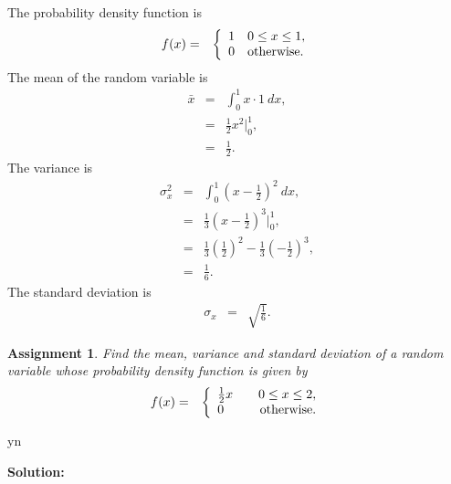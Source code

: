 \documentclass[12pt]{article}
\def\solutions{y}
\def\solutions{n}
\newtheorem{assignment}{Assignment}[section]
\newcommand{\lp}{\left(}
\newcommand{\rp}{\right)}
\begin{document}
The probability density function is
\begin{eqnarray*}
  f(x) & = & \left\{
    \begin{array}{r@{\hspace{1em}}l}
      1 & 0\leq x \leq 1, \\
      0 & \mathrm{otherwise}. 
    \end{array}
    \right.
\end{eqnarray*}
The mean of the random variable is 
\begin{eqnarray*}
  \bar{x} & = & \int^1_0 x \cdot 1 ~ dx, \\
  & = & \frac{1}{2} x^2 \bigg|^1_0, \\
  & = & \frac{1}{2}.
\end{eqnarray*}
The variance is
\begin{eqnarray*}
  \sigma^2_x & = & \int^1_0 \lp x - \frac{1}{2} \rp^2 ~ dx, \\
  & = & \frac{1}{3} \lp x - \frac{1}{2} \rp^3 \bigg|^1_0, \\
  & = & \frac{1}{3} \lp \frac{1}{2} \rp^2 - 
  \frac{1}{3} \lp -\frac{1}{2} \rp^3, \\
  & = & \frac{1}{6}.
\end{eqnarray*}
The standard deviation is
\begin{eqnarray*}
  \sigma_x & = & \sqrt{\frac{1}{6}}.
\end{eqnarray*}


\fi

\begin{assignment}
  Find the mean, variance and standard deviation of a random variable
  whose probability density function is given by
  \begin{eqnarray*}
    f(x) & = & \left\{
      \begin{array}{l@{\hspace{2em}}r}
        \frac{1}{2} x & 0 \leq x \leq 2, \\
        0 & \mathrm{otherwise.}
      \end{array}
      \right.
  \end{eqnarray*}
\end{assignment}

\if y\solutions

\textbf{Solution:}
\end{document}
